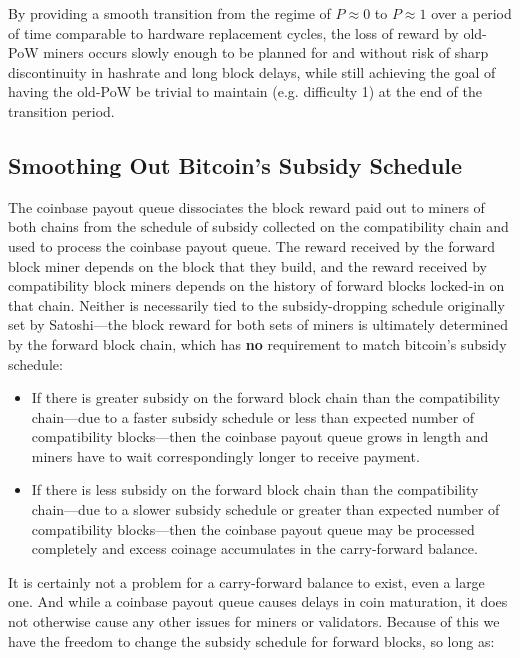By providing a smooth transition from the regime of $P \approx 0$ to
$P \approx 1$ over a period of time comparable to hardware replacement
cycles, the loss of reward by old-PoW miners occurs slowly enough to
be planned for and without risk of sharp discontinuity in hashrate and
long block delays, while still achieving the goal of having the
old-PoW be trivial to maintain (e.g. difficulty \num{1}) at the end of
the transition period.

\subsection{Smoothing Out Bitcoin's Subsidy Schedule}

The coinbase payout queue dissociates the block reward paid out to
miners of both chains from the schedule of subsidy collected on the
compatibility chain and used to process the coinbase payout queue.
The reward received by the forward block miner depends on the block
that they build, and the reward received by compatibility block miners
depends on the history of forward blocks locked-in on that chain.
Neither is necessarily tied to the subsidy-dropping schedule
originally set by Satoshi---the block reward for both sets of miners
is ultimately determined by the forward block chain, which has
\textbf{no} requirement to match bitcoin's subsidy schedule:

\begin{itemize}

  \item

    If there is greater subsidy on the forward block chain than the
    compatibility chain---due to a faster subsidy schedule or less
    than expected number of compatibility blocks---then the coinbase
    payout queue grows in length and miners have to wait
    correspondingly longer to receive payment.

  \item

    If there is less subsidy on the forward block chain than the
    compatibility chain---due to a slower subsidy schedule or
    greater than expected number of compatibility blocks---then the
    coinbase payout queue may be processed completely and excess
    coinage accumulates in the carry-forward balance.

\end{itemize}

It is certainly not a problem for a carry-forward balance to exist,
even a large one.  And while a coinbase payout queue causes delays in
coin maturation, it does not otherwise cause any other issues for
miners or validators.  Because of this we have the freedom to change
the subsidy schedule for forward blocks, so long as:

